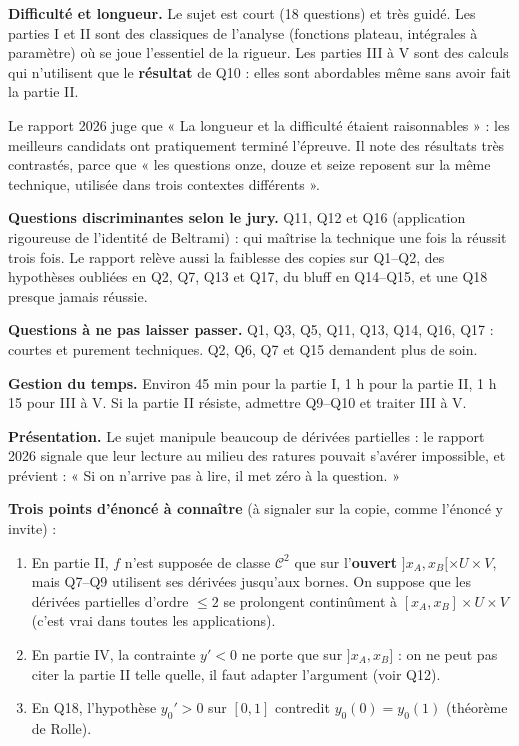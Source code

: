 \documentclass[11pt,a4paper]{article}
\providecommand{\tightlist}{\setlength{\itemsep}{0pt}\setlength{\parskip}{0pt}}
\begin{document}
\textbf{Difficulté et longueur.} Le sujet est court (18 questions) et très guidé. Les parties I et II sont des classiques de l'analyse (fonctions plateau, intégrales à paramètre) où se joue l'essentiel de la rigueur. Les parties III à V sont des calculs qui n'utilisent que le \textbf{résultat} de Q10 : elles sont abordables même sans avoir fait la partie II.

Le rapport 2026 juge que « La longueur et la difficulté étaient raisonnables » : les meilleurs candidats ont pratiquement terminé l'épreuve. Il note des résultats très contrastés, parce que « les questions onze, douze et seize reposent sur la même technique, utilisée dans trois contextes différents ».

\textbf{Questions discriminantes selon le jury.} Q11, Q12 et Q16 (application rigoureuse de l'identité de Beltrami) : qui maîtrise la technique une fois la réussit trois fois. Le rapport relève aussi la faiblesse des copies sur Q1--Q2, des hypothèses oubliées en Q2, Q7, Q13 et Q17, du bluff en Q14--Q15, et une Q18 presque jamais réussie.

\textbf{Questions à ne pas laisser passer.} Q1, Q3, Q5, Q11, Q13, Q14, Q16, Q17 : courtes et purement techniques. Q2, Q6, Q7 et Q15 demandent plus de soin.

\textbf{Gestion du temps.} Environ 45 min pour la partie I, 1 h pour la partie II, 1 h 15 pour III à V. Si la partie II résiste, admettre Q9--Q10 et traiter III à V.

\textbf{Présentation.} Le sujet manipule beaucoup de dérivées partielles : le rapport 2026 signale que leur lecture au milieu des ratures pouvait s'avérer impossible, et prévient : « Si on n'arrive pas à lire, il met zéro à la question. »

\textbf{Trois points d'énoncé à connaître} (à signaler sur la copie, comme l'énoncé y invite) :

\begin{enumerate}
\def\labelenumi{\arabic{enumi}.}
\tightlist
\item
  En partie II, \(f\) n'est supposée de classe \(\mathcal C^2\) que sur l'\textbf{ouvert} \(]x_A,x_B[\times U\times V\), mais Q7--Q9 utilisent ses dérivées jusqu'aux bornes. On suppose que les dérivées partielles d'ordre \(\le2\) se prolongent continûment à \([x_A,x_B]\times U\times V\) (c'est vrai dans toutes les applications).
\item
  En partie IV, la contrainte \(y'<0\) ne porte que sur \(]x_A,x_B]\) : on ne peut pas citer la partie II telle quelle, il faut adapter l'argument (voir Q12).
\item
  En Q18, l'hypothèse \(y_0'>0\) sur \([0,1]\) contredit \(y_0(0)=y_0(1)\) (théorème de Rolle).
\end{enumerate}
\end{document}
